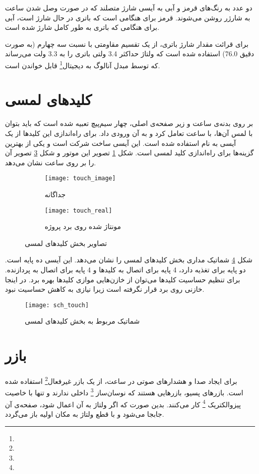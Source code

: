 دو عدد  به رنگ‌های قرمز و آبی به آیسی شارژ متصلند که در صورت وصل شدن ساعت به شارژر روشن می‌شوند. قرمز برای هنگامی است که باتری در حال شارژ است، آبی برای هنگامی که باتری به طور کامل شارژ شده است.

برای قرائت مقدار شارژ باتری، از یک تقسیم مقاومتی با نسبت سه چهارم (به صورت دقیق 76.0) استفاده شده است که ولتاژ حداکثر 3.4 ولتی باتری را به 3.3 ولت می‌رساند که توسط مبدل آنالوگ به دیجیتال\footnote{} قابل خواندن است.

\section{کلیدهای لمسی}
بر روی بدنه‌ی ساعت و زیر صفحه‌ی اصلی، چهار سیم‌پیچ تعبیه شده است که باید بتوان با لمس آن‌ها، با ساعت تعامل کرد و به آن ورودی داد. برای راه‌اندازی این کلیدها از یک آیسی به نام  استفاده شده است. این آیسی ساخت شرکت  است و یکی از بهترین گزینه‌ها برای راه‌اندازی کلید لمسی است. شکل \ref{fig:touch_image} تصویر این موتور و شکل \ref{fig:touch_real} تصویر آن را بر روی \pcbf ساعت نشان می‌دهد.

\begin{figure}[h]
	\centering
	\begin{subfigure}{0.35\textwidth}
		\centering
		\texttt{[image: touch\_image]}
		\caption{جداگانه}
		\label{fig:touch_image}
	\end{subfigure}
	\begin{subfigure}{0.4\textwidth}
		\centering
		\texttt{[image: touch\_real]}
		\caption{مونتاژ شده روی برد پروژه}
		\label{fig:touch_real}
	\end{subfigure}
	\caption{تصاویر بخش کلیدهای لمسی}
\end{figure}

شکل \ref{fig:sch-touch} شماتیک مداری بخش کلیدهای لمسی را نشان می‌دهد. این آیسی ده پایه است. دو پایه برای تغذیه دارد، 4 پایه برای اتصال به کلیدها و 4 پایه برای اتصال به پردازنده. برای تنظیم حساسیت کلیدها می‌توان از خازن‌هایی موازی کلیدها بهره برد. در اینجا خازنی روی برد قرار نگرفته است زیرا نیازی به کاهش حساسیت نبود.

\begin{figure}[h]
	\centering
	\texttt{[image: sch\_touch]}
	\caption{شماتیک مربوط به بخش کلیدهای لمسی}
	\label{fig:sch-touch}
\end{figure}

\section{بازر}
برای ایجاد صدا و هشدارهای صوتی در ساعت، از یک بازر غیرفعال\footnote{} استفاده شده است. بازرهای پسیو، بازرهایی هستند که نوسان‌ساز \footnote{} داخلی ندارند و تنها با خاصیت پیزوالکتریک \footnote{} کار می‌کنند. بدین صورت که اگر ولتاژ به آن اعمال شود، صفحه‌ی آن جابجا می‌شود و با قطع ولتاژ به مکان اولیه باز می‌گردد.

